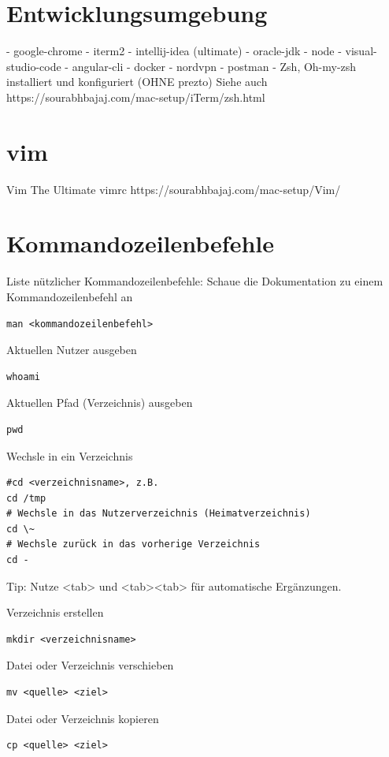 \documentclass[]{article}
\begin{document}
\section{Entwicklungsumgebung}
    - google-chrome
- iterm2
- intellij-idea (ultimate)
- oracle-jdk
- node
- visual-studio-code
- angular-cli
- docker
- nordvpn
- postman
- Zsh, Oh-my-zsh installiert und konfiguriert (OHNE prezto)
Siehe auch https://sourabhbajaj.com/mac-setup/iTerm/zsh.html

\section{vim}
Vim
The Ultimate vimrc
https://sourabhbajaj.com/mac-setup/Vim/
\section{Kommandozeilenbefehle}
Liste nützlicher Kommandozeilenbefehle:
Schaue die Dokumentation zu einem Kommandozeilenbefehl an
\begin{verbatim}
man <kommandozeilenbefehl>
\end{verbatim}

Aktuellen Nutzer ausgeben
\begin{verbatim}
whoami
\end{verbatim}

Aktuellen Pfad (Verzeichnis) ausgeben
\begin{verbatim}
pwd
\end{verbatim}

Wechsle in ein Verzeichnis
\begin{verbatim}
#cd <verzeichnisname>, z.B.
cd /tmp
# Wechsle in das Nutzerverzeichnis (Heimatverzeichnis)
cd \~
# Wechsle zurück in das vorherige Verzeichnis
cd -
\end{verbatim}

Tip: Nutze <tab> und <tab><tab> für automatische Ergänzungen.

Verzeichnis erstellen
\begin{verbatim}
mkdir <verzeichnisname>
\end{verbatim}

Datei oder Verzeichnis verschieben
\begin{verbatim}
mv <quelle> <ziel>
\end{verbatim}

Datei oder Verzeichnis kopieren
\begin{verbatim}
cp <quelle> <ziel>
\end{verbatim}
\end{document}
